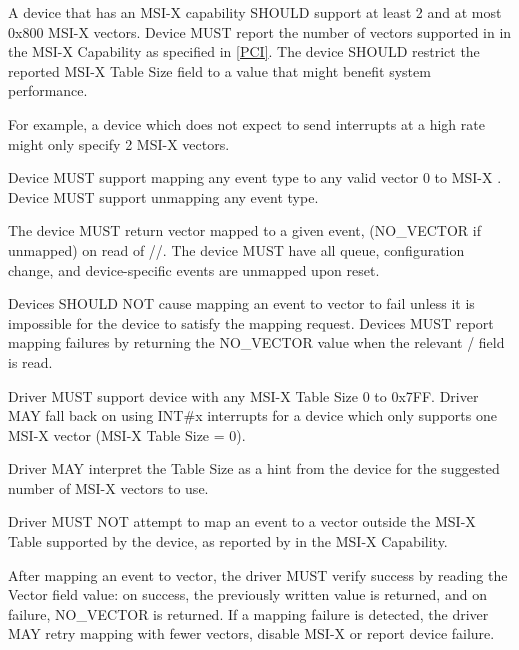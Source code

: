 A device that has an MSI-X capability SHOULD support at least 2
and at most 0x800 MSI-X vectors.
Device MUST report the number of vectors supported in
 in the MSI-X Capability as specified in
\hyperref[intro:PCI]{[PCI]}.
The device SHOULD restrict the reported MSI-X Table Size field
to a value that might benefit system performance.
\begin{note}
For example, a device which does not expect to send
interrupts at a high rate might only specify 2 MSI-X vectors.
\end{note}
Device MUST support mapping any event type to any valid
vector 0 to MSI-X .
Device MUST support unmapping any event type.

The device MUST return vector mapped to a given event,
(NO_VECTOR if unmapped) on read of
//.
The device MUST have all queue, configuration change, and
device-specific events are unmapped upon reset.

Devices SHOULD NOT cause mapping an event to vector to fail
unless it is impossible for the device to satisfy the mapping
request.  Devices MUST report mapping
failures by returning the NO_VECTOR value when the relevant
/ field
is read.


Driver MUST support device with any MSI-X Table Size 0 to 0x7FF.
Driver MAY fall back on using INT\#x interrupts for a device
which only supports one MSI-X vector (MSI-X Table Size = 0).

Driver MAY interpret the Table Size as a hint from the device
for the suggested number of MSI-X vectors to use.

Driver MUST NOT attempt to map an event to a vector
outside the MSI-X Table supported by the device,
as reported by  in the MSI-X Capability.

After mapping an event to vector, the
driver MUST verify success by reading the Vector field value: on
success, the previously written value is returned, and on
failure, NO_VECTOR is returned. If a mapping failure is detected,
the driver MAY retry mapping with fewer vectors, disable MSI-X
or report device failure.

